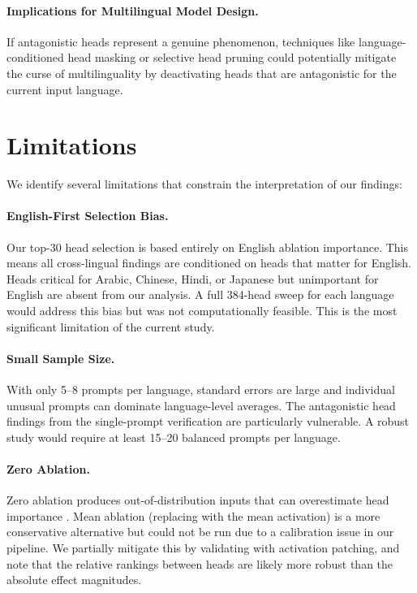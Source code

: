 \documentclass[11pt]{article}
\begin{document}
\paragraph{Implications for Multilingual Model Design.}
If antagonistic heads represent a genuine phenomenon, techniques like language-conditioned head masking \cite{chen2025focusing} or selective head pruning could potentially mitigate the curse of multilinguality by deactivating heads that are antagonistic for the current input language.

\section{Limitations}

We identify several limitations that constrain the interpretation of our findings:

\paragraph{English-First Selection Bias.}
Our top-30 head selection is based entirely on English ablation importance.
This means all cross-lingual findings are conditioned on heads that matter for English.
Heads critical for Arabic, Chinese, Hindi, or Japanese but unimportant for English are absent from our analysis.
A full 384-head sweep for each language would address this bias but was not computationally feasible.
This is the most significant limitation of the current study.

\paragraph{Small Sample Size.}
With only 5--8 prompts per language, standard errors are large and individual unusual prompts can dominate language-level averages.
The antagonistic head findings from the single-prompt verification are particularly vulnerable.
A robust study would require at least 15--20 balanced prompts per language.

\paragraph{Zero Ablation.}
Zero ablation produces out-of-distribution inputs that can overestimate head importance \cite{li2024optimal}.
Mean ablation (replacing with the mean activation) is a more conservative alternative but could not be run due to a calibration issue in our pipeline.
We partially mitigate this by validating with activation patching, and note that the relative rankings between heads are likely more robust than the absolute effect magnitudes.
\end{document}

